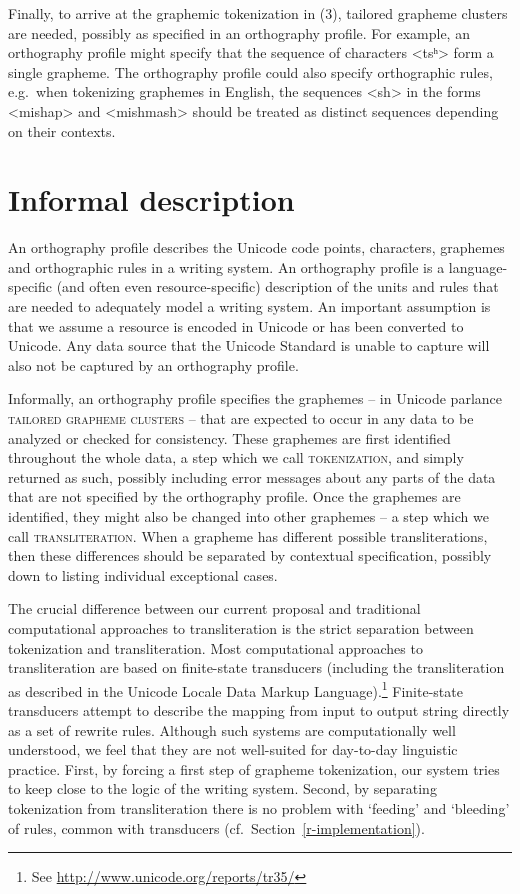 Finally, to arrive at the graphemic tokenization in (3), tailored grapheme
clusters are needed, possibly as specified in an orthography profile. For example,
an orthography profile might specify that the sequence of characters <tsʰ> form
a single grapheme. The orthography profile could also specify orthographic
rules, e.g.~when tokenizing graphemes in English, the sequences <sh> in the
forms <mishap> and <mishmash> should be treated as distinct sequences depending
on their contexts.

\section{Informal description}
\label{informal-description-of-orthography-profiles}

An orthography profile describes the Unicode code points, characters, graphemes
and orthographic rules in a writing system. An orthography profile is a
language-specific (and often even resource-specific) description of the units
and rules that are needed to adequately model a writing system. An important
assumption is that we assume a resource is encoded in Unicode or
has been converted to Unicode. Any data source that the Unicode Standard is
unable to capture will also not be captured by an orthography profile.

Informally, an orthography profile specifies the graphemes -- in Unicode
parlance \textsc{tailored grapheme clusters} -- that are expected to occur in any
data to be analyzed or checked for consistency. These graphemes are first
identified throughout the whole data, a step which we call
\textsc{tokenization}, and simply returned as such, possibly including
error messages about any parts of the data that are not specified by the
orthography profile. Once the graphemes are identified, they might also be
changed into other graphemes -- a step which we call \textsc{transliteration}.
When a grapheme has different possible transliterations, then these differences
should be separated by contextual specification, possibly down to listing
individual exceptional cases.

The crucial difference between our current proposal and traditional
computational approaches to transliteration is the strict separation between
tokenization and transliteration. Most computational approaches to
transliteration are based on finite-state transducers (including the
transliteration as described in the Unicode Locale Data Markup
Language).\footnote{See \url{http://www.unicode.org/reports/tr35/}} Finite-state 
transducers attempt to describe the mapping from input to output string directly 
as a set of rewrite rules. Although such systems are computationally well 
understood, we feel that they are not well-suited for day-to-day linguistic 
practice. First, by forcing a first step of grapheme tokenization, our system 
tries to keep close to the logic of the writing system. Second, by separating 
tokenization from transliteration there is no problem with `feeding' and 
`bleeding' of rules, common with transducers (cf.~Section~\ref{r-implementation}).

